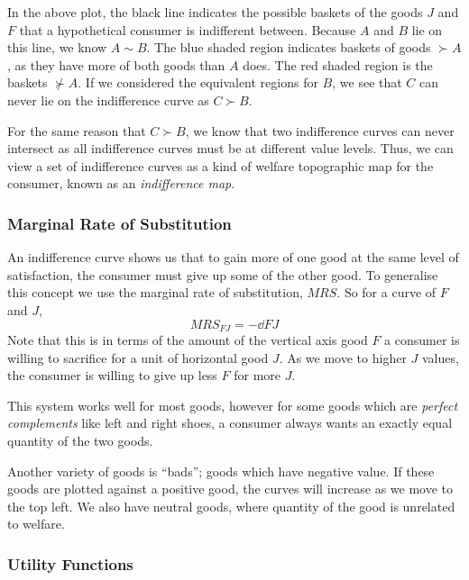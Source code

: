 \documentclass[12pt]{report}
\begin{document}
\begin{flushleft}
In the above plot, the black line indicates the possible baskets of the goods
\(J\) and \(F\) that a hypothetical consumer is indifferent between. Because
\(A\) and \(B\) lie on this line, we know \(A \sim B\). The blue shaded region
indicates baskets of goods \(\succ A\), as they have more of both goods than
\(A\) does. The red shaded region is the baskets \(\nsucc A\). If we considered
the equivalent regions for \(B\), we see that \(C\) can never lie on the
indifference curve as \(C \succ B\). \par
For the same reason that \(C \succ B\), we
know that two indifference curves can never intersect as all indifference curves
must be at different value levels. Thus, we can view a set of indifference
curves as a kind of welfare topographic map for the consumer, known as an
\textit{indifference map}.

\subsubsection*{Marginal Rate of Substitution}

An indifference curve shows us that to gain more of one good at the same level
of satisfaction, the consumer must give up some of the other good. To generalise
this concept we use the marginal rate of substitution, \(MRS\). So for a curve
of \(F\) and \(J\),
\[MRS_{FJ} = -\dd{F}{J}\]
Note that this is in terms of the amount of the vertical axis good \(F\) a
consumer is willing to sacrifice for a unit of horizontal good \(J\). As we move
to higher \(J\) values, the consumer is willing to give up less \(F\) for more
\(J\). \par
This system works well for most goods, however for some goods which are
\textit{perfect complements} like left and right shoes, a consumer always wants
an exactly equal quantity of the two goods. \par
Another variety of goods is ``bads''; goods which have negative value. If these
goods are plotted against a positive good, the curves will increase as we move
to the top left. We also have neutral goods, where quantity of the good is
unrelated to welfare.

\subsubsection*{Utility Functions}


\end{flushleft}
\end{document}
